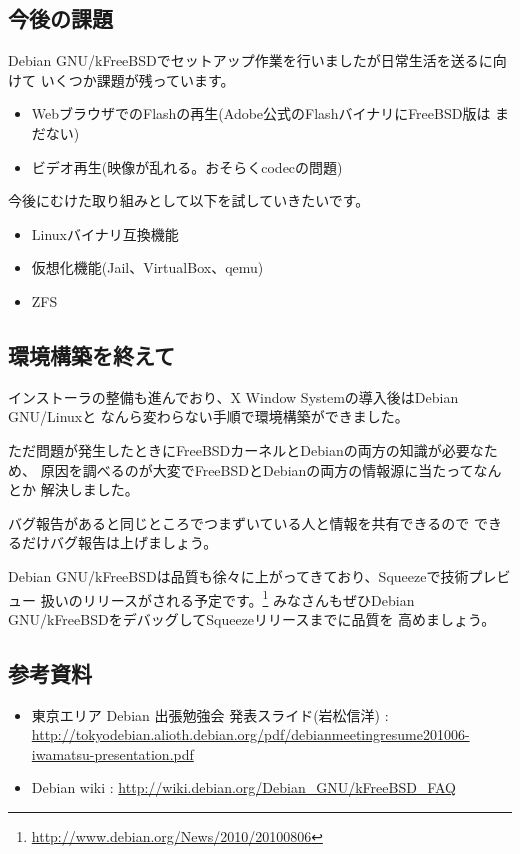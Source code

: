 \documentclass[mingoth,a4paper]{jsarticle}
\begin{document}

\subsection{今後の課題}
Debian GNU/kFreeBSDでセットアップ作業を行いましたが日常生活を送るに向けて
いくつか課題が残っています。

\begin{itemize}
 \item WebブラウザでのFlashの再生(Adobe公式のFlashバイナリにFreeBSD版は
まだない)
 \item ビデオ再生(映像が乱れる。おそらくcodecの問題)
\end{itemize}

今後にむけた取り組みとして以下を試していきたいです。

\begin{itemize}
 \item Linuxバイナリ互換機能
 \item 仮想化機能(Jail、VirtualBox、qemu)
 \item ZFS
\end{itemize}

\subsection{環境構築を終えて}
インストーラの整備も進んでおり、X Window Systemの導入後はDebian GNU/Linuxと
なんら変わらない手順で環境構築ができました。

ただ問題が発生したときにFreeBSDカーネルとDebianの両方の知識が必要なため、
原因を調べるのが大変でFreeBSDとDebianの両方の情報源に当たってなんとか
解決しました。

バグ報告があると同じところでつまずいている人と情報を共有できるので
できるだけバグ報告は上げましょう。

Debian GNU/kFreeBSDは品質も徐々に上がってきており、Squeezeで技術プレビュー
扱いのリリースがされる予定です。\footnote{\url{http://www.debian.org/News/2010/20100806}}
みなさんもぜひDebian GNU/kFreeBSDをデバッグしてSqueezeリリースまでに品質を
高めましょう。

\subsection{参考資料}
\begin{itemize}
 \item 東京エリア Debian 出張勉強会 発表スライド(岩松信洋) : \url{http://tokyodebian.alioth.debian.org/pdf/debianmeetingresume201006-iwamatsu-presentation.pdf}
 \item Debian wiki : \url{http://wiki.debian.org/Debian\_GNU/kFreeBSD\_FAQ}
\end{itemize}
\end{document}
